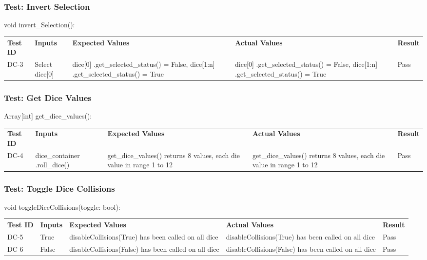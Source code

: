 \documentclass[12pt, titlepage]{article}
\begin{document}
\subsubsection{Test: Invert Selection}
void invert\_Selection():\\
\begin{tabularx}{\textwidth}{|p{2cm}|p{3.5cm}|p{4cm}|p{4cm}|p{1.5cm}|}
    \cline{1-5}
    \textbf{Test ID} & \textbf{Inputs} & \textbf{Expected Values} & \textbf{Actual Values} & \textbf{Result} \\
    \cline{1-5}
    DC-3 & Select dice[0] & dice[0] .get\_selected\_status() = False, dice[1:n] .get\_selected\_status() = True & dice[0] .get\_selected\_status() = False, dice[1:n] .get\_selected\_status() = True & Pass \\
    \cline{1-5}
\end{tabularx}

\subsubsection{Test: Get Dice Values}
Array[int] get\_dice\_values():\\
\begin{tabularx}{\textwidth}{|p{2cm}|p{3.5cm}|p{4cm}|p{4cm}|p{1.5cm}|}
    \cline{1-5}
    \textbf{Test ID} & \textbf{Inputs} & \textbf{Expected Values} & \textbf{Actual Values} & \textbf{Result} \\
    \cline{1-5}
    DC-4 & dice\_container .roll\_dice() & get\_dice\_values() returns 8 values, each die value in range 1 to 12 & get\_dice\_values() returns 8 values, each die value in range 1 to 12 & Pass \\
    \cline{1-5}
\end{tabularx}

\subsubsection{Test: Toggle Dice Collisions}
void toggleDiceCollisions(toggle: bool):\\
\begin{tabularx}{\textwidth}{|p{2cm}|p{3.5cm}|p{4cm}|p{4cm}|p{1.5cm}|}
    \cline{1-5}
    \textbf{Test ID} & \textbf{Inputs} & \textbf{Expected Values} & \textbf{Actual Values} & \textbf{Result} \\
    \cline{1-5}
    DC-5 & True & disableCollisions(True) has been called on all dice & disableCollisions(True) has been called on all dice & Pass \\
    \cline{1-5}
    DC-6 & False & disableCollisions(False) has been called on all dice & disableCollisions(False) has been called on all dice & Pass \\
    \cline{1-5}
\end{tabularx}
\end{document}
